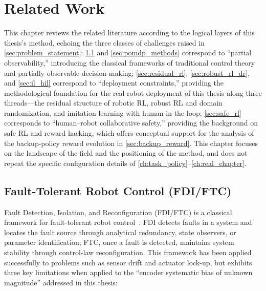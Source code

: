 
\chapter{Related Work}\label{ch:related_work}

This chapter reviews the related literature according to the logical layers of this thesis's method, echoing the three classes of challenges raised in \cref{sec:problem_statement}: \cref{sec:ftc} and \cref{sec:pomdp_methods} correspond to ``partial observability,'' introducing the classical frameworks of traditional control theory and partially observable decision-making; \cref{sec:residual_rl}, \cref{sec:robust_rl_dr}, and \cref{sec:il_hil} correspond to ``deployment constraints,'' providing the methodological foundation for the real-robot deployment of this thesis along three threads---the residual structure of robotic RL, robust RL and domain randomization, and imitation learning with human-in-the-loop; \cref{sec:safe_rl} corresponds to ``human--robot collaborative safety,'' providing the background on safe RL and reward hacking, which offers conceptual support for the analysis of the backup-policy reward evolution in \cref{sec:backup_reward}. This chapter focuses on the landscape of the field and the positioning of the method, and does not repeat the specific configuration details of \cref{ch:task_policy}--\cref{ch:real_chapter}.

\section{Fault-Tolerant Robot Control (FDI/FTC)}\label{sec:ftc}

Fault Detection, Isolation, and Reconfiguration (FDI/FTC) is a classical framework for fault-tolerant robot control~\cite{blanke2016diagnosis}. FDI detects faults in a system and locates the fault source through analytical redundancy, state observers, or parameter identification; FTC, once a fault is detected, maintains system stability through control-law reconfiguration. This framework has been applied successfully to problems such as sensor drift and actuator lock-up, but exhibits three key limitations when applied to the ``encoder systematic bias of unknown magnitude'' addressed in this thesis:

